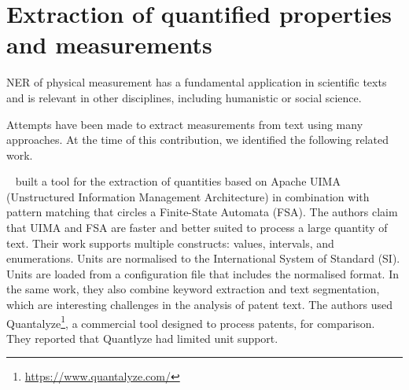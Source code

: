 

\section{Extraction of quantified properties and measurements} 
NER of physical measurement has a fundamental application in scientific texts and is relevant in other disciplines, including humanistic or social science. 

Attempts have been made to extract measurements from text using many approaches. At the time of this contribution, we identified the following related work. 

~\cite{aras2014applications} built a tool for the extraction of quantities based on Apache UIMA (Unstructured Information Management Architecture) in combination with pattern matching that circles a Finite-State Automata (FSA). 
The authors claim that UIMA and FSA are faster and better suited to process a large quantity of text.
Their work supports multiple constructs: values, intervals, and enumerations. Units are normalised to the International System of Standard (SI). 
Units are loaded from a configuration file that includes the normalised format. In the same work, they also combine keyword extraction and text segmentation, which are interesting challenges in the analysis of patent text. 
The authors used Quantalyze\footnote{\url{https://www.quantalyze.com/}}, a commercial tool designed to process patents, for comparison. They reported that Quantlyze had limited unit support. 


